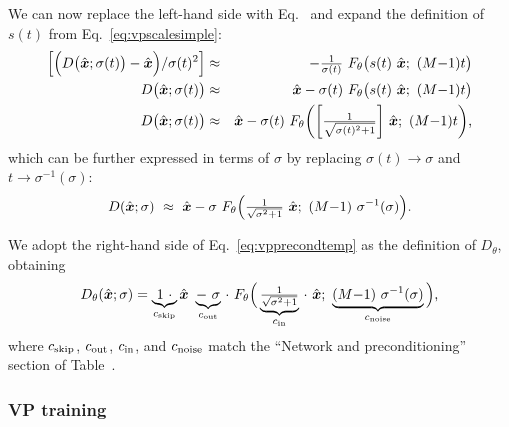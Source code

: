 We can now replace the left-hand side with Eq.~ and expand the definition of $s(t)$ from Eq.~\ref{eq:vpscalesimple}:
\begin{eqnarray}
  \Big[ \Big( D\big( \hat{\boldsymbol{x}}; \sigma(t) \big) - \hat{\boldsymbol{x}} \Big) / \sigma(t)^2 \Big] &\approx& {-}\tfrac{1}{\sigma(t)} ~F_\theta\big( s(t) ~\hat{\boldsymbol{x}}; ~(M{-}1)t \big) \\
  D\big( \hat{\boldsymbol{x}}; \sigma(t) \big) &\approx& \hat{\boldsymbol{x}} - \sigma(t) ~F_\theta\big( s(t) ~\hat{\boldsymbol{x}}; ~(M{-}1)t \big) \\
  D\big( \hat{\boldsymbol{x}}; \sigma(t) \big) &\approx& \hat{\boldsymbol{x}} - \sigma(t) ~F_\theta\bigg( \bigg[ \tfrac{1}{\sqrt{\sigma(t)^2 + 1}} \bigg] ~\hat{\boldsymbol{x}}; ~(M{-}1)t \bigg)
  \text{,}
\end{eqnarray}
which can be further expressed in terms of $\sigma$ by replacing $\sigma(t) \rightarrow \sigma$ and $t \rightarrow \sigma^{-1}(\sigma)$:
\begin{equation}
  D(\hat{\boldsymbol{x}}; \sigma) ~\approx~ \hat{\boldsymbol{x}} - \sigma ~F_\theta\Big( \tfrac{1}{\sqrt{\sigma^2 + 1}} ~\hat{\boldsymbol{x}}; ~(M{-}1) ~\sigma^{-1}(\sigma) \Big)
  \label{eq:vpprecondtemp}
  \text{.}
\end{equation}

We adopt the right-hand side of Eq.~\ref{eq:vpprecondtemp} as the definition of $D_\theta$, obtaining
\begin{equation}
  D_\theta(\hat{\boldsymbol{x}}; \sigma) = \underbrace{1~\cdot}_{c_\text{skip}}\hat{\boldsymbol{x}} ~\underbrace{-~\sigma}_{c_\text{out}} \,\cdot ~F_\theta\Big( \underbrace{\tfrac{1}{\sqrt{\sigma^2 + 1}}}_{c_\text{in}} \,\cdot~\hat{\boldsymbol{x}}; ~\underbrace{(M{-}1)~\sigma^{-1}(\sigma)}_{c_\text{noise}} \Big)
  \label{eq:vpprecond}
  \text{,}
\end{equation}
where $c_\text{skip}$, $c_\text{out}$, $c_\text{in}$, and $c_\text{noise}$ match the ``Network and preconditioning'' section of Table~.

\subsubsection{VP training}


